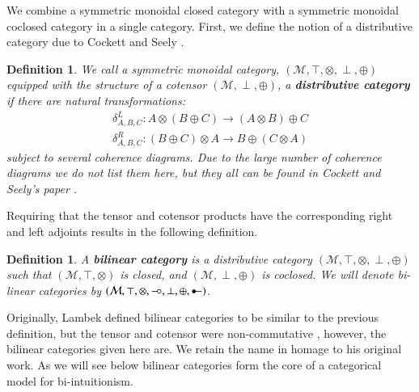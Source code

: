 \documentclass{lmcs}
\newtheorem{definition}[theorem]{Definition}
\let\mto\to
\let\to\relax
\newcommand{\to}{\rightarrow}
\newcommand{\cat}[1]{\mathcal{#1}}
\newcommand{\limp}[0]{\multimap}
\newcommand{\colimp}[0]{\multimapdotinv}
\def\limp{\mathrel{-\!\circ}}
\begin{document}
We combine a symmetric monoidal closed category with a symmetric
monoidal coclosed category in a single category.  First, we define the
notion of a distributive category due to Cockett and Seely \cite{Cockett:1997}.
\begin{definition}
  \label{def:dist-cat}
  We call a symmetric monoidal category, $(\cat{M}, \top, \otimes,
  \perp, \oplus)$ equipped with the structure of a cotensor $(\cat{M},
  \perp, \oplus)$, a \textbf{distributive category} if there are
  natural transformations:
  \[
  \begin{array}{lll}
    \delta^L_{A,B,C} : A \otimes (B \oplus C) \mto (A \otimes B) \oplus C\\
    \delta^R_{A,B,C} : (B \oplus C) \otimes A \mto B \oplus (C \otimes A)
  \end{array}
  \]
  subject to several coherence diagrams.  Due to the large number of
  coherence diagrams we do not list them here, but they all can be
  found in Cockett and Seely's paper \cite{Cockett:1997}.
\end{definition}
\noindent
Requiring that the tensor and cotensor products have the corresponding
right and left adjoints results in the following definition.
\begin{definition}
  \label{def:bilinear-cat}
  A \textbf{bilinear category} is a distributive category $(\cat{M},
  \top, \otimes, \perp, \oplus)$ such that $(\cat{M}, \top, \otimes)$
  is closed, and $(\cat{M}, \perp, \oplus)$ is coclosed.  We will
  denote bi-linear categories by $(\cat{M}, \top, \otimes, \limp, \perp,
  \oplus, \colimp)$.
\end{definition}
Originally, Lambek defined bilinear categories to be similar to the
previous definition, but the tensor and cotensor were non-commutative
\cite{Cockett:1997a}, however, the bilinear categories given here
are. We retain the name in homage to his original work.  As we will
see below bilinear categories form the core of a categorical model for
bi-intuitionism.
\end{document}
